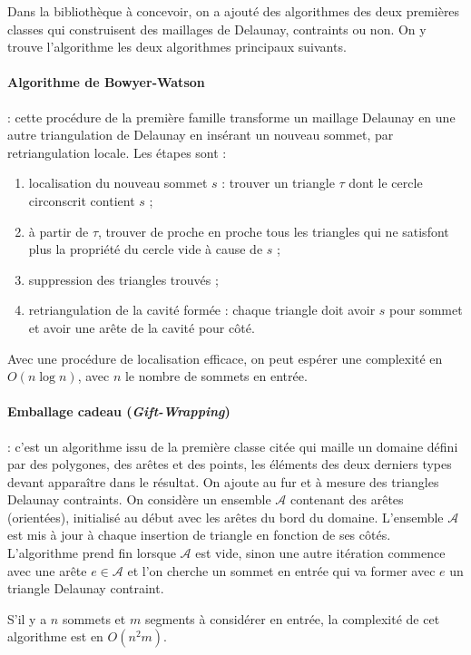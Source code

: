 \documentclass[12pt,a4paper]{report}
\begin{document}
Dans la bibliothèque à concevoir, on a ajouté des algorithmes des deux premières classes qui construisent des maillages de Delaunay, contraints ou non. On y trouve l'algorithme les deux algorithmes principaux suivants.

\paragraph{Algorithme de Bowyer-Watson} : cette procédure de la première famille transforme un maillage Delaunay en une autre triangulation de Delaunay en insérant un nouveau sommet, par retriangulation locale. Les étapes sont :
\begin{enumerate}
\item localisation du nouveau sommet $s$ : trouver un triangle $\tau$ dont le cercle circonscrit contient $s$ ;
\item à partir de $\tau$, trouver de proche en proche tous les triangles qui ne satisfont plus la propriété du cercle vide à cause de $s$ ;
\item suppression des triangles trouvés ;
\item retriangulation de la cavité formée : chaque triangle doit avoir $s$ pour sommet et avoir une arête de la cavité pour côté.
\end{enumerate}
Avec une procédure de localisation efficace, on peut espérer une complexité en $O(n\log n)$, avec $n$ le nombre de sommets en entrée.

\paragraph{Emballage cadeau (\emph{Gift-Wrapping})} : c'est un algorithme issu de la première classe citée qui maille un domaine défini par des polygones, des arêtes et des points, les éléments des deux derniers types devant apparaître dans le résultat. On ajoute au fur et à mesure des triangles Delaunay contraints. On considère un ensemble $\mathcal{A}$ contenant des arêtes (orientées), initialisé au début avec les arêtes du bord du domaine. L'ensemble $\mathcal{A}$ est mis à jour à chaque insertion de triangle en fonction de ses côtés. L'algorithme prend fin lorsque $\mathcal{A}$ est vide, sinon une autre itération commence avec une arête $e\in\mathcal{A}$ et l'on cherche un sommet en entrée qui va former avec $e$ un triangle Delaunay contraint.

S'il y a $n$ sommets et $m$ segments à considérer en entrée, la complexité de cet algorithme est en $O(n^{2}m)$.
\end{document}
